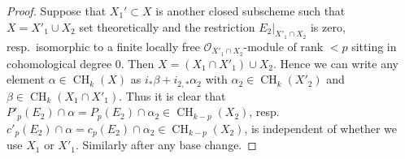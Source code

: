 \documentclass[10pt,a4paper]{amsart}
\theoremstyle{plain}
\theoremstyle{definition}
\theoremstyle{remark}
\numberwithin{equation}{subsection}
\def\CH{\mathop{\mathrm{CH}}\nolimits}
\begin{document}
\begin{proof}
Suppose that $X_1' \subset X$ is another closed subscheme such that
$X = X'_1 \cup X_2$ set theoretically and the restriction
$E_2|_{X'_1 \cap X_2}$ is zero, resp.\ isomorphic to a
finite locally free $\mathcal{O}_{X'_1 \cap X_2}$-module
of rank $< p$ sitting in cohomological degree $0$.
Then $X = (X_1 \cap X'_1) \cup X_2$. Hence we can write
any element $\alpha \in \CH_k(X)$ as $i_*\beta + i_{2, *}\alpha_2$ with
$\alpha_2 \in \CH_k(X'_2)$ and $\beta \in \CH_k(X_1 \cap X'_1)$.
Thus it is clear that
$P'_p(E_2) \cap \alpha = P_p(E_2) \cap \alpha_2 \in \CH_{k - p}(X_2)$,
resp.\  $c'_p(E_2) \cap \alpha = c_p(E_2) \cap \alpha_2 \in \CH_{k - p}(X_2)$,
is independent of whether we use $X_1$ or $X'_1$. Similarly
after any base change.
\end{proof}
\end{document}
